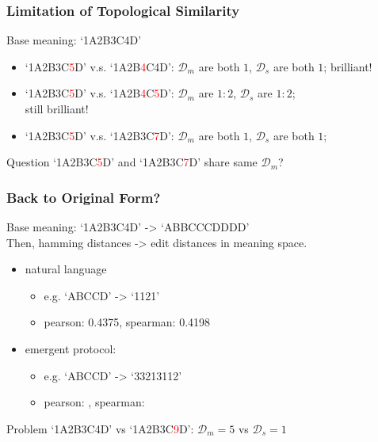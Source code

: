 \documentclass[compress,mathserif,xcolor=dvipsnames,svgnames,aspectratio=43]{beamer}
\begin{document}
\begin{frame}[c]
  \frametitle{Limitation of Topological Similarity}
  Base meaning: `1A2B3C4D'
  
  \begin{itemize}
    \item `1A2B3C\textcolor{red}{5}D' v.s. `1A2B\textcolor{red}{4}C4D': $\mathcal{D}_m$ are both $1$, $\mathcal{D}_s$ are both $1$; brilliant!
    \item `1A2B3C\textcolor{red}{5}D' v.s. `1A2B\textcolor{red}{4}C\textcolor{red}{5}D': $\mathcal{D}_m$ are $1:2$, $\mathcal{D}_s$ are $1:2$; \\still brilliant!
    \pause
    \item `1A2B3C\textcolor{red}{5}D' v.s. `1A2B3C\textcolor{red}{7}D': $\mathcal{D}_m$ are both $1$, $\mathcal{D}_s$ are both $1$;
  \end{itemize}

  \pause
  \begin{block}{Question}
    `1A2B3C\textcolor{red}{5}D' and `1A2B3C\textcolor{red}{7}D' share same $\mathcal{D}_m$?
  \end{block}

\end{frame}

\begin{frame}[c]
  \frametitle{Back to Original Form?}
  Base meaning: `1A2B3C4D' -> `ABBCCCDDDD' \\
  Then, hamming distances -> edit distances in meaning space.
  \begin{itemize}
    \item natural language
      \begin{itemize}
        \item e.g. `ABCCD' -> `1121'
        \item pearson: 0.4375, spearman: 0.4198
      \end{itemize}
    \item emergent protocol:
    \begin{itemize}
      \item e.g. `ABCCD' -> `33213112'
      \item pearson: , spearman:
    \end{itemize}
  \end{itemize}

  \begin{block}{Problem}
    `1A2B3C4D' vs `1A2B3C\textcolor{red}{9}D': $\mathcal{D}_m = 5$ vs $\mathcal{D}_s = 1$
  \end{block}
\end{frame}
\end{document}

